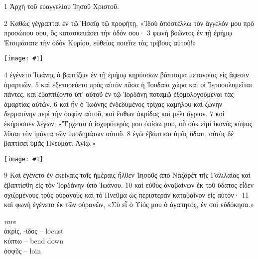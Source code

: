 \documentclass[10pt,a5paper,twoside,twocolumn]{book}
\newcommand{\fig}[1]{\texttt{[image: \#1]}\label{fig:#1}}
\newcommand*\cleartoleftpage{%
  \ifodd\value{page}\hbox{}\clearpage\fi
}
\newenvironment{facing}{\cleartoleftpage}{\clearpage\pagebreak}
\newenvironment{help}{\pagebreak}{}
\newenvironment{helpsec}{\begin{minipage}[t]{\textwidth}\begin{multicols}{2}}{\end{multicols}\end{minipage}}
\newenvironment{vocab}{\begin{helpsec}}{\end{helpsec}}
\begin{document}

\begin{facing}

1 Ἀρχὴ τοῦ εὐαγγελίου Ἰησοῦ Χριστοῦ.

2 Καθὼς γέγραπται ἐν τῷ Ἡσαΐᾳ τῷ προφήτῃ,
	«Ἰδοὺ ἀποστέλλω τὸν ἄγγελόν μου πρὸ προσώπου σου, 
	ὃς κατασκευάσει τὴν ὁδόν σου·
		3 φωνὴ βοῶντος ἐν τῇ ἐρήμῳ 
	Ἑτοιμάσατε τὴν ὁδὸν Κυρίου, 
	εὐθείας ποιεῖτε τὰς τρίβους αὐτοῦ!»

\fig{01-04} %

4 ἐγένετο Ἰωάνης ὁ βαπτίζων ἐν τῇ ἐρήμῳ κηρύσσων βάπτισμα μετανοίας εἰς ἄφεσιν ἁμαρτιῶν. 5 καὶ ἐξεπορεύετο πρὸς αὐτὸν πᾶσα ἡ Ἰουδαία χώρα καὶ οἱ Ἱεροσολυμεῖται πάντες, καὶ ἐβαπτίζοντο ὑπ’ αὐτοῦ ἐν τῷ Ἰορδάνῃ ποταμῷ ἐξομολογούμενοι τὰς ἁμαρτίας αὐτῶν. 6 καὶ ἦν ὁ Ἰωάνης ἐνδεδυμένος τρίχας καμήλου καὶ ζώνην δερματίνην περὶ τὴν ὀσφὺν αὐτοῦ, καὶ ἔσθων ἀκρίδας καὶ μέλι ἄγριον. 7 καὶ ἐκήρυσσεν λέγων, «Ἔρχεται ὁ ἰσχυρότερός μου ὀπίσω μου, οὗ οὐκ εἰμὶ ἱκανὸς κύψας λῦσαι τὸν ἱμάντα τῶν ὑποδημάτων αὐτοῦ. 8 ἐγὼ ἐβάπτισα ὑμᾶς ὕδατι, αὐτὸς δὲ βαπτίσει ὑμᾶς Πνεύματι Ἁγίῳ.»

\fig{01-09} %

	9 Καὶ ἐγένετο ἐν ἐκείναις ταῖς ἡμέραις ἦλθεν Ἰησοῦς ἀπὸ Ναζαρὲτ τῆς Γαλιλαίας καὶ ἐβαπτίσθη εἰς τὸν Ἰορδάνην ὑπὸ Ἰωάνου. 10 καὶ εὐθὺς ἀναβαίνων ἐκ τοῦ ὕδατος εἶδεν σχιζομένους τοὺς οὐρανοὺς καὶ τὸ Πνεῦμα ὡς περιστερὰν καταβαῖνον εἰς αὐτόν· 
11 καὶ φωνὴ ἐγένετο ἐκ τῶν οὐρανῶν, «Σὺ εἶ ὁ Υἱός μου ὁ ἀγαπητός, ἐν σοὶ εὐδόκησα.»


\begin{help}

\begin{vocab}

\emph{rare}\\
ἀκρίς, -ίδος -- locust \\
κύπτω -- bend down\\
ὀσφῦς -- loin\\


\end{vocab}
\end{help}
\end{facing}
\end{document}
